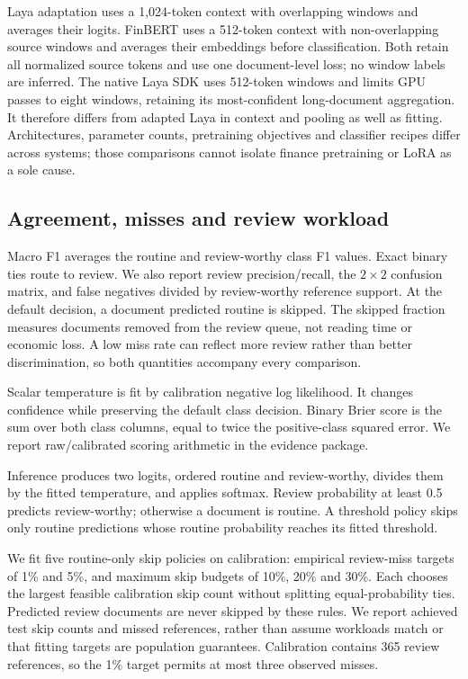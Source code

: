 \documentclass[11pt,a4paper]{article}
\begin{document}
Laya adaptation uses a 1,024-token context with overlapping windows and averages
their logits. FinBERT uses a 512-token context with non-overlapping source windows
and averages their embeddings before classification. Both retain all normalized
source tokens and use one document-level loss; no window labels are inferred.
The native Laya SDK uses 512-token windows and limits GPU passes to eight windows,
retaining its most-confident long-document aggregation. It therefore differs from
adapted Laya in context and pooling as well as fitting. Architectures, parameter counts,
pretraining objectives and classifier recipes differ across systems; those
comparisons cannot isolate finance pretraining or LoRA as a sole cause.

\subsection{Agreement, misses and review workload}
Macro F1 averages the routine and review-worthy class F1 values. Exact binary
ties route to review. We also report review precision/recall, the $2\times2$
confusion matrix, and false negatives divided by review-worthy reference
support. At the default decision, a document predicted routine is skipped.
The skipped fraction measures documents removed from the review queue, not
reading time or economic loss. A low miss rate can reflect more review rather
than better discrimination, so both quantities accompany every comparison.

Scalar temperature is fit by calibration negative log likelihood. It changes
confidence while preserving the default class decision. Binary Brier score is
the sum over both class columns, equal to twice the positive-class squared
error. We report raw/calibrated scoring arithmetic in the evidence package.

Inference produces two logits, ordered routine and review-worthy, divides them
by the fitted temperature, and applies softmax. Review probability at least 0.5
predicts review-worthy; otherwise a document is routine. A threshold policy skips
only routine predictions whose routine probability reaches its fitted threshold.

We fit five routine-only skip policies on calibration: empirical review-miss
targets of 1\% and 5\%, and maximum skip budgets of 10\%, 20\% and 30\%.
Each chooses the largest feasible calibration skip count without splitting
equal-probability ties. Predicted review documents are never skipped by these
rules. We report achieved test skip counts and missed references, rather than
assume workloads match or that fitting targets are population guarantees.
Calibration contains 365 review references, so the 1\% target permits at most
three observed misses.
\end{document}

